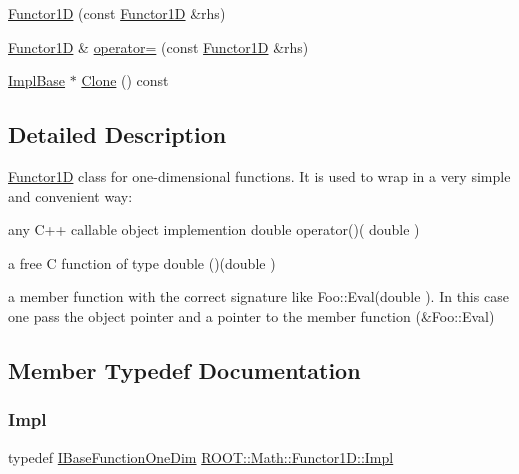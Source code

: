 \begin{DoxyCompactItemize}
\item 
\mbox{\hyperlink{classROOT_1_1Math_1_1Functor1D_a3323053da6385e3168b80163b266c600}{Functor1D}} (const \mbox{\hyperlink{classROOT_1_1Math_1_1Functor1D}{Functor1D}} \&rhs)
\item 
\mbox{\hyperlink{classROOT_1_1Math_1_1Functor1D}{Functor1D}} \& \mbox{\hyperlink{classROOT_1_1Math_1_1Functor1D_a723dff64cd3d4e53174624fa56f30a18}{operator=}} (const \mbox{\hyperlink{classROOT_1_1Math_1_1Functor1D}{Functor1D}} \&rhs)
\item 
\mbox{\hyperlink{classROOT_1_1Math_1_1Functor1D_a1ade2017edb7db0cbaf9a27a864f4dd3}{Impl\+Base}} $\ast$ \mbox{\hyperlink{classROOT_1_1Math_1_1Functor1D_af77ece084fc56e41c06e32e0f78a88a9}{Clone}} () const
\end{DoxyCompactItemize}


\subsection{Detailed Description}
\mbox{\hyperlink{classROOT_1_1Math_1_1Functor1D}{Functor1D}} class for one-\/dimensional functions. It is used to wrap in a very simple and convenient way\+: 
\begin{DoxyItemize}
\item any C++ callable object implemention double operator()( double  ) 
\item a free C function of type double ()(double ) 
\item a member function with the correct signature like Foo\+::\+Eval(double ). In this case one pass the object pointer and a pointer to the member function (\&Foo\+::\+Eval) 
\end{DoxyItemize}

\subsection{Member Typedef Documentation}
\mbox{\label{classROOT_1_1Math_1_1Functor1D_ae7e0743edafd220a53b994cbbfbd7a9a}} 
\subsubsection{\texorpdfstring{Impl}{Impl}\hspace{0.1cm}{\footnotesize\ttfamily [1/2]}}
{\footnotesize\ttfamily typedef \mbox{\hyperlink{classROOT_1_1Math_1_1IBaseFunctionOneDim}{I\+Base\+Function\+One\+Dim}} \mbox{\hyperlink{classROOT_1_1Math_1_1Functor1D_ae7e0743edafd220a53b994cbbfbd7a9a}{R\+O\+O\+T\+::\+Math\+::\+Functor1\+D\+::\+Impl}}}

